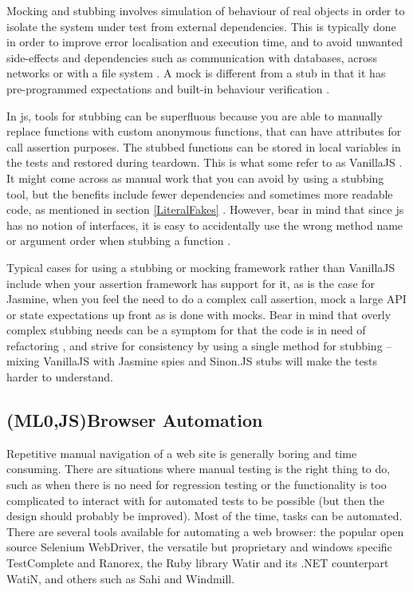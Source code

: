 \documentclass[11pt]{article}
\begin{document}
Mocking and stubbing involves simulation of behaviour of real objects in order to isolate the system under test from external dependencies. This is typically done in order to improve error localisation and execution time, and to avoid unwanted side-effects and dependencies such as communication with databases, across networks or with a file system \cite[ch.~2]{Legacy}. A mock is different from a stub in that it has pre-programmed expectations and built-in behaviour verification \cite[p.~453]{Tddjs}.

In \gls{js}, tools for stubbing can be superfluous because you are able to manually replace functions with custom anonymous functions, that can have attributes for call assertion purposes. The stubbed functions can be stored in local variables in the tests and restored during teardown. This is what some refer to as VanillaJS \cite[question~53]{Edelstam}. It might come across as manual work that you can avoid by using a stubbing tool, but the benefits include fewer dependencies and sometimes more readable code, as mentioned in section \ref{LiteralFakes} \cite[questions~54-55]{Edelstam}. However, bear in mind that since \gls{js} has no notion of interfaces, it is easy to accidentally use the wrong method name or argument order when stubbing a function \cite[p.~471]{Tddjs}.

Typical cases for using a stubbing or mocking framework rather than VanillaJS include when your assertion framework has support for it, as is the case for Jasmine, when you feel the need to do a complex call assertion, mock a large API or state expectations up front as is done with mocks. Bear in mind that overly complex stubbing needs can be a symptom for that the code is in need of refactoring \cite[question~34]{Stenmark}, and strive for consistency by using a single method for stubbing -- mixing VanillaJS with Jasmine spies and Sinon.JS stubs will make the tests harder to understand.

\subsection{(ML0,JS)Browser Automation}
\label{subsec:browserautomation}

Repetitive manual navigation of a web site is generally boring and time consuming. There are situations where manual testing is the right thing to do, such as when there is no need for regression testing or the functionality is too complicated to interact with for automated tests to be possible (but then the design should probably be improved). Most of the time, tasks can be automated. There are several tools available for automating a web browser: the popular open source Selenium WebDriver, the versatile but proprietary and windows specific TestComplete and Ranorex, the Ruby library Watir and its .NET counterpart WatiN, and others such as Sahi and Windmill.
\end{document}
